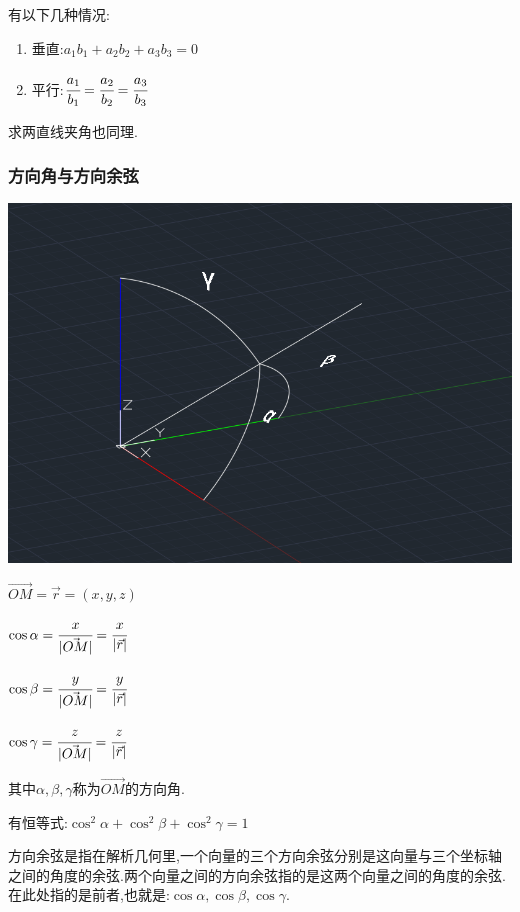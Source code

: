 \documentclass[UTF8,12pt]{ctexbook}
\begin{document}
{{{{\begin{itemize}
{              有以下几种情况:
              \begin{enumerate}
                \item 垂直:$a_1b_1 + a_2b_2 + a_3b_3 = 0$
                \item 平行:$\cfrac{a_1}{b_1} = \cfrac{a_2}{b_2} = \cfrac{a_3}{b_3}$
              \end{enumerate}

              求两直线夹角也同理.
              }
      \end{itemize}
    }%

    \subsubsection{方向角与方向余弦}{
      \begin{center}
        \includegraphics[scale = 0.5]{resources/directionAngle.png}
      \end{center}

      $\vec{OM} = \vec{r} = (x,y,z)$

      $\cos\alpha = \cfrac{x}{|\vec{OM}|} = \cfrac{x}{|\vec{r}|}$

      $\cos\beta = \cfrac{y}{|\vec{OM}|} = \cfrac{y}{|\vec{r}|}$

      $\cos\gamma = \cfrac{z}{|\vec{OM}|} = \cfrac{z}{|\vec{r}|}$

      其中$\alpha,\beta,\gamma$称为$\vec{OM}$的方向角.

      有恒等式:$\cos^2\alpha + \cos^2\beta + \cos^2\gamma = 1$

      方向余弦是指在解析几何里,一个向量的三个方向余弦分别是这向量与三个坐标轴之间的角度的余弦.两个向量之间的方向余弦指的是这两个向量之间的角度的余弦.在此处指的是前者,也就是:$\cos\alpha,\cos\beta,\cos\gamma$.

}}}}
\end{document}
